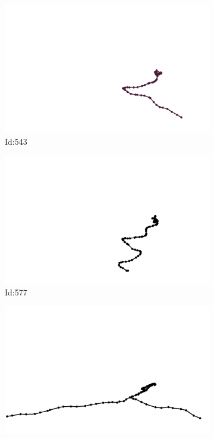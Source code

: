 \documentclass[12pt,twoside]{report}
\begin{document}
\begin{figure}
\centering
\begin{subfigure}[b]{0.20\textwidth}
\centering
\includegraphics[width=\textwidth]{../../trajectories/543.png}
\caption{Id:543}
\end{subfigure}
\begin{subfigure}[b]{0.20\textwidth}
\centering
\includegraphics[width=\textwidth]{../../trajectories/577.png}
\caption{Id:577}
\end{subfigure}
\begin{subfigure}[b]{0.20\textwidth}
\centering
\includegraphics[width=\textwidth]{../../trajectories/626.png}

\end{subfigure}
\end{figure}
\end{document}

